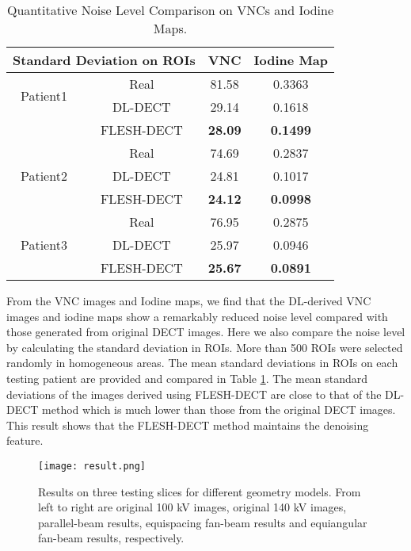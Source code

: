 \documentclass[journal,twoside,web]{ieeecolor}
\begin{document}
\begin{table}[t]%
    \begin{center}
        \caption{Quantitative Noise Level Comparison on VNCs and Iodine Maps.}
        \begin{tabular}{ c c | c c }
            \hline\hline
            \multicolumn{2}{c}{Standard Deviation on ROIs} & VNC & Iodine Map \\
            \hline
            \multirow{2}{*}{Patient1} & Real & 81.58 & 0.3363 \\
            & DL-DECT & 29.14 & 0.1618 \\
            & FLESH-DECT & \textbf{28.09} & \textbf{0.1499} \\
            \hline
            \multirow{3}{*}{Patient2} & Real & 74.69 & 0.2837 \\
            & DL-DECT & 24.81 & 0.1017 \\
            & FLESH-DECT & \textbf{24.12} & \textbf{0.0998} \\
            \hline
            \multirow{3}{*}{Patient3} & Real & 76.95 & 0.2875 \\
            & DL-DECT & 25.97 & 0.0946 \\
            & FLESH-DECT & \textbf{25.67} & \textbf{0.0891}\\
            \hline\hline
        \end{tabular}
        \label{tab:3}
    \end{center}
\end{table}

From the VNC images and Iodine maps, we find that the DL-derived VNC images and iodine maps show a remarkably reduced noise level compared with those generated from original DECT images. Here we also compare the noise level by calculating the standard deviation in ROIs. More than 500 ROIs were selected randomly in homogeneous areas. The mean standard deviations in ROIs on each testing patient are provided and compared in Table \ref{tab:3}. The mean standard deviations of the images derived using FLESH-DECT are close to that of the DL-DECT method which is much lower than those from the original DECT images. This result shows that the FLESH-DECT method maintains the denoising feature.

\begin{figure*}[tb]
    \centering
        \texttt{[image: result.png]}
        \caption{Results on three testing slices for different geometry models. From left to right are original 100 kV images, original 140 kV images, parallel-beam results, equispacing fan-beam results and equiangular fan-beam results, respectively. }
    \label{fig:7}
\end{figure*}
\end{document}
